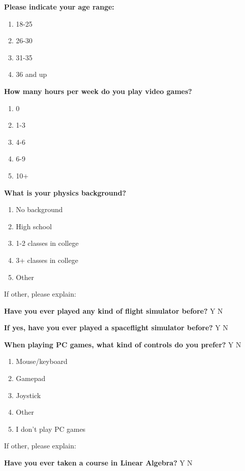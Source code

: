 \vspace{5mm}
\noindent\textbf{Please indicate your age range:}
\begin{enumerate}
  \item 18-25
  \item 26-30
  \item 31-35
  \item 36 and up
\end{enumerate}

\vspace{5mm}
\noindent\textbf{How many hours per week do you play video games?}
\begin{enumerate}
  \item 0
  \item 1-3
  \item 4-6
  \item 6-9
  \item 10+
\end{enumerate}

\vspace{5mm}
\noindent\textbf{What is your physics background?}
\begin{enumerate}
  \item No background
  \item High school
  \item 1-2 classes in college
  \item 3+ classes in college
  \item Other
\end{enumerate}
If other, please explain:

\vspace{5mm}
\noindent\textbf{Have you ever played any kind of flight simulator before?} Y N

\vspace{5mm}
\noindent\textbf{If yes, have you ever played a spaceflight simulator before?} Y N

\vspace{5mm}
\noindent\textbf{When playing PC games, what kind of controls do you prefer?} Y N
\begin{enumerate}
  \item Mouse/keyboard
  \item Gamepad
  \item Joystick
  \item Other
  \item I don’t play PC games
\end{enumerate}
If other, please explain:

\vspace{5mm}
\noindent\textbf{Have you ever taken a course in Linear Algebra?} Y N

